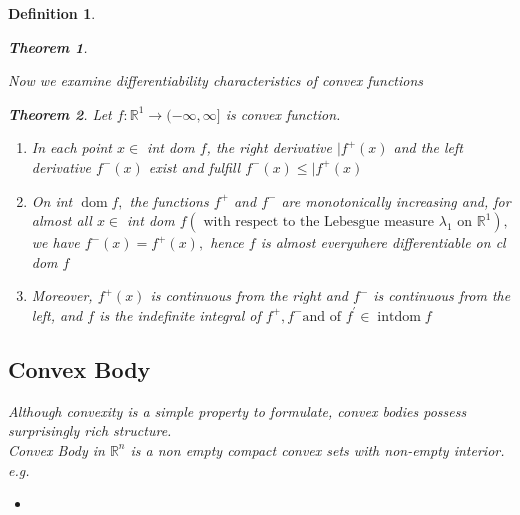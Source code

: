 \documentclass[oneside]{book}
\newtheorem{theorem}{Theorem}[section]
\newtheorem{mydef}{Definition}
\begin{document}
\begin{mydef}
\begin{theorem}
\end{theorem}	
\newpage	
Now we examine differentiability characteristics of convex functions	
\begin{theorem}	
\label{t:7.9}
 Let $f: \mathbb{R}^{1} \rightarrow(-\infty, \infty]$ is convex function.	
\begin{enumerate}	
    \item 	
 In each point $x \in$ int dom $f$, the right derivative $| f^{+}(x)$ and the left derivative $f^{-}(x)$ exist and fulfill $f^{-}(x) \leq | f^{+}(x)$	
\\	
\item	
 On int $\operatorname{dom} f,$ the functions $f^{+}$ and $f^{-}$ are monotonically increasing and, for almost all	
$x \in$ int dom $f\left(\text { with respect to the Lebesgue measure } \lambda_{1} \text { on } \mathbb{R}^{1}\right),$ we have $f^{-}(x)=f^{+}(x),$ hence $f$ is almost everywhere differentiable on cl dom $f$	
\\	
\item	
 Moreover, $f^{+}(x)$	
is continuous from the right and $f^{-}$ is continuous from the left, and $f$ is the indefinite integral of $ f^{+}, f^{-} \text {and of } f^{\prime} \in \operatorname{int dom} f$
\end{enumerate}	






\end{theorem}








\begin{comment}
\begin{mydef} \label{d:12}
A function $f: \mathbb{R}^{n} \rightarrow(-\infty, \infty]$ is \textbf{positively homogeneous} of degree 1 if
$$
f(\alpha x)=\alpha f(x), \quad \text { for all } x \in \mathbb{R}^{n}, \alpha \geq 0
$$
$f$ is convex if and only if it is subadditive, given  $f$ is positively homogeneous  as
$$
 f(x+y) \leq f(x)+f(y)  \text{ and }f(\alpha x)=\alpha f(x) $$,
  \quad $ \text { for all } R$
  gives definition of convex function
\end{mydef}
\end{comment}
 \subsection{Convex Body}
 \label{ss:18}
 Although convexity is a simple property to formulate, convex bodies possess surprisingly rich structure. \\
Convex Body in  $\mathbb{R}^n$  is a non empty compact convex sets with non-empty interior.
e.g.
\begin{itemize}
    \item
    

\end{itemize}
\end{mydef}
\end{document}
